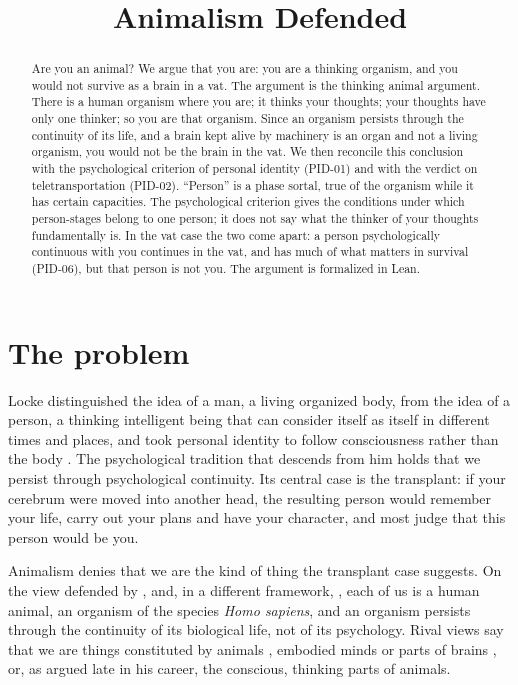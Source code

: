 \documentclass{situationist-preprint}
\title{Animalism Defended}
\begin{document}
\maketitle

\begin{abstract}
Are you an animal? We argue that you are: you are a thinking organism, and you would not survive as a brain in a vat. The argument is the thinking animal argument. There is a human organism where you are; it thinks your thoughts; your thoughts have only one thinker; so you are that organism. Since an organism persists through the continuity of its life, and a brain kept alive by machinery is an organ and not a living organism, you would not be the brain in the vat. We then reconcile this conclusion with the psychological criterion of personal identity (PID-01) and with the verdict on teletransportation (PID-02). \enquote{Person} is a phase sortal, true of the organism while it has certain capacities. The psychological criterion gives the conditions under which person-stages belong to one person; it does not say what the thinker of your thoughts fundamentally is. In the vat case the two come apart: a person psychologically continuous with you continues in the vat, and has much of what matters in survival (PID-06), but that person is not you. The argument is formalized in Lean.
\end{abstract}

\section{The problem}

Locke distinguished the idea of a man, a living organized body, from the idea of a person, a thinking intelligent being that can consider itself as itself in different times and places, and took personal identity to follow consciousness rather than the body \citep[II.xxvii]{Locke1694}. The psychological tradition that descends from him \citep{Shoemaker1970,Parfit1984} holds that we persist through psychological continuity. Its central case is the transplant: if your cerebrum were moved into another head, the resulting person would remember your life, carry out your plans and have your character, and most judge that this person would be you.

Animalism denies that we are the kind of thing the transplant case suggests. On the view defended by \citet{Snowdon1990,Snowdon2014}, \citet{Olson1997,Olson2007} and, in a different framework, \citet{vanInwagen1990}, each of us is a human animal, an organism of the species \emph{Homo sapiens}, and an organism persists through the continuity of its biological life, not of its psychology. Rival views say that we are things constituted by animals \citep{Baker2000}, embodied minds or parts of brains \citep{McMahan2002}, or, as \citet{Parfit2012} argued late in his career, the conscious, thinking parts of animals.
\end{document}
